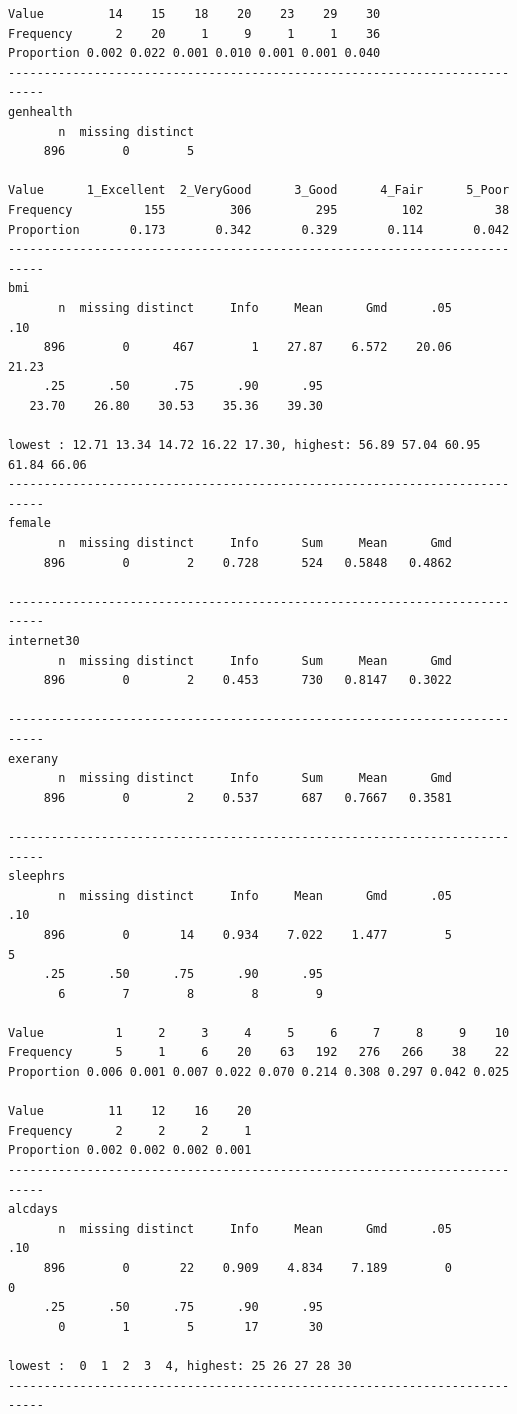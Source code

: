 \documentclass[]{book}
\theoremstyle{definition}
\theoremstyle{definition}
\theoremstyle{definition}
\theoremstyle{remark}
\begin{document}
\begin{verbatim}
Value         14    15    18    20    23    29    30
Frequency      2    20     1     9     1     1    36
Proportion 0.002 0.022 0.001 0.010 0.001 0.001 0.040
---------------------------------------------------------------------------
genhealth 
       n  missing distinct 
     896        0        5 
                                                                      
Value      1_Excellent  2_VeryGood      3_Good      4_Fair      5_Poor
Frequency          155         306         295         102          38
Proportion       0.173       0.342       0.329       0.114       0.042
---------------------------------------------------------------------------
bmi 
       n  missing distinct     Info     Mean      Gmd      .05      .10 
     896        0      467        1    27.87    6.572    20.06    21.23 
     .25      .50      .75      .90      .95 
   23.70    26.80    30.53    35.36    39.30 

lowest : 12.71 13.34 14.72 16.22 17.30, highest: 56.89 57.04 60.95 61.84 66.06
---------------------------------------------------------------------------
female 
       n  missing distinct     Info      Sum     Mean      Gmd 
     896        0        2    0.728      524   0.5848   0.4862 

---------------------------------------------------------------------------
internet30 
       n  missing distinct     Info      Sum     Mean      Gmd 
     896        0        2    0.453      730   0.8147   0.3022 

---------------------------------------------------------------------------
exerany 
       n  missing distinct     Info      Sum     Mean      Gmd 
     896        0        2    0.537      687   0.7667   0.3581 

---------------------------------------------------------------------------
sleephrs 
       n  missing distinct     Info     Mean      Gmd      .05      .10 
     896        0       14    0.934    7.022    1.477        5        5 
     .25      .50      .75      .90      .95 
       6        7        8        8        9 
                                                                      
Value          1     2     3     4     5     6     7     8     9    10
Frequency      5     1     6    20    63   192   276   266    38    22
Proportion 0.006 0.001 0.007 0.022 0.070 0.214 0.308 0.297 0.042 0.025
                                  
Value         11    12    16    20
Frequency      2     2     2     1
Proportion 0.002 0.002 0.002 0.001
---------------------------------------------------------------------------
alcdays 
       n  missing distinct     Info     Mean      Gmd      .05      .10 
     896        0       22    0.909    4.834    7.189        0        0 
     .25      .50      .75      .90      .95 
       0        1        5       17       30 

lowest :  0  1  2  3  4, highest: 25 26 27 28 30
---------------------------------------------------------------------------
\end{verbatim}
\end{document}
